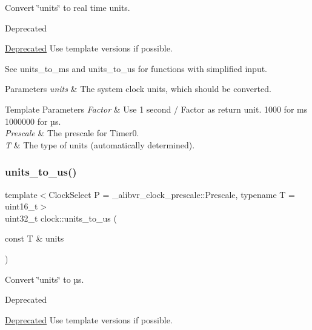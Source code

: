 Convert \char`\"{}units\char`\"{} to real time units. 

\begin{DoxyRefDesc}{Deprecated}
\item[\hyperlink{deprecated__deprecated000001}{Deprecated}]Use template versions if possible.\end{DoxyRefDesc}


See units\+\_\+to\+\_\+ms and units\+\_\+to\+\_\+us for functions with simplified input.


\begin{DoxyParams}{Parameters}
{\em units} & The system clock units, which should be converted. \\
\hline
\end{DoxyParams}

\begin{DoxyTemplParams}{Template Parameters}
{\em Factor} & Use 1 second / Factor as return unit. 1\textquotesingle{}000 for ms 1\textquotesingle{}000\textquotesingle{}000 for µs. \\
\hline
{\em Prescale} & The prescale for {\ttfamily Timer0}. \\
\hline
{\em T} & The type of units (automatically determined). \\
\hline
\end{DoxyTemplParams}
\hypertarget{namespaceclock_ad223db3a13e650f8e16585cde9ff08ac}{}\label{namespaceclock_ad223db3a13e650f8e16585cde9ff08ac} 
\subsubsection{\texorpdfstring{units\+\_\+to\+\_\+us()}{units\_to\_us()}\hspace{0.1cm}{\footnotesize\ttfamily [1/2]}}
{\footnotesize\ttfamily template$<$Clock\+Select P = \+\_\+alibvr\+\_\+clock\+\_\+prescale\+::\+Prescale, typename T  = uint16\+\_\+t$>$ \\
uint32\+\_\+t clock\+::units\+\_\+to\+\_\+us (\begin{DoxyParamCaption}\item[{const T \&}]{units }\end{DoxyParamCaption})\hspace{0.3cm}{\ttfamily [inline]}}



Convert \char`\"{}units\char`\"{} to µs. 

\begin{DoxyRefDesc}{Deprecated}
\item[\hyperlink{deprecated__deprecated000006}{Deprecated}]Use template versions if possible.\end{DoxyRefDesc}



